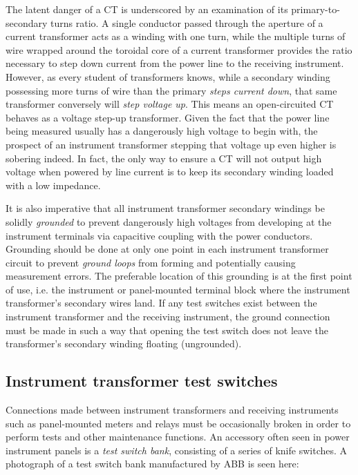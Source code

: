 The latent danger of a CT is underscored by an examination of its primary-to-secondary turns ratio.  A single conductor passed through the aperture of a current transformer acts as a winding with one turn, while the multiple turns of wire wrapped around the toroidal core of a current transformer provides the ratio necessary to step down current from the power line to the receiving instrument.  However, as every student of transformers knows, while a secondary winding possessing more turns of wire than the primary \textit{steps current down}, that same transformer conversely will \textit{step voltage up}.  This means an open-circuited CT behaves as a voltage step-up transformer.  Given the fact that the power line being measured usually has a dangerously high voltage to begin with, the prospect of an instrument transformer stepping that voltage up even higher is sobering indeed.  In fact, the only way to ensure a CT will not output high voltage when powered by line current is to keep its secondary winding loaded with a low impedance.

\vskip 10pt

It is also imperative that all instrument transformer secondary windings be solidly \textit{grounded} to prevent dangerously high voltages from developing at the instrument terminals via capacitive coupling with the power conductors.  Grounding should be done at only one point in each instrument transformer circuit to prevent \textit{ground loops} from forming and potentially causing measurement errors.  The preferable location of this grounding is at the first point of use, i.e. the instrument or panel-mounted terminal block where the instrument transformer's secondary wires land.  If any test switches exist between the instrument transformer and the receiving instrument, the ground connection must be made in such a way that opening the test switch does not leave the transformer's secondary winding floating (ungrounded). 









\filbreak
\subsection{Instrument transformer test switches}

Connections made between instrument transformers and receiving instruments such as panel-mounted meters and relays must be occasionally broken in order to perform tests and other maintenance functions.  An accessory often seen in power instrument panels is a \textit{test switch bank}, consisting of a series of knife switches.  A photograph of a test switch bank manufactured by ABB is seen here:  

